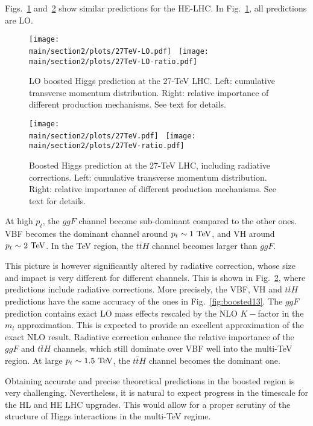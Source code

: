 Figs.~\ref{fig:boosted27-LO} and~\ref{fig:boosted27} show similar predictions for the HE-LHC. In Fig.~\ref{fig:boosted27-LO}, all predictions are LO. 
\begin{figure}[h]
\begin{center}
    \texttt{[image: \\main/section2/plots/27TeV-LO.pdf]}~
    \texttt{[image: \\main/section2/plots/27TeV-LO-ratio.pdf]}
    \caption{
    LO boosted Higgs prediction at the 27-TeV LHC. Left: cumulative transverse momentum distribution.
    Right: relative importance of different production mechanisms. See text for details. 
        \label{fig:boosted27-LO}}
        \end{center}
\end{figure}
\begin{figure}[h]
\begin{center}
    \texttt{[image: \\main/section2/plots/27TeV.pdf]}~
    \texttt{[image: \\main/section2/plots/27TeV-ratio.pdf]}
    \caption{
    Boosted Higgs prediction at the 27-TeV LHC, including radiative corrections. Left: cumulative transverse momentum distribution.
    Right: relative importance of different production mechanisms. See text for details. 
        \label{fig:boosted27}}
        \end{center}
\end{figure}
At high $p_t$, the $ggF$ channel become sub-dominant compared to the other ones. VBF becomes the dominant channel around  $p_t\sim 1~{\rm TeV}$, 
and VH around $p_t\sim 2~{\rm TeV}$. In the TeV region, the $t\bar t H$ channel becomes larger than $ggF$. 

This picture is however significantly altered by radiative correction, whose size and impact is very different for different channels. 
This is shown in Fig.~\ref{fig:boosted27}, where predictions include radiative corrections. More precisely, the VBF, VH and $t\bar t H$ 
predictions have the same accuracy of the ones in Fig.~\ref{fig:boosted13}. The $ggF$ prediction contains exact LO mass effects rescaled
by the NLO $K-$factor in the $m_t$ approximation. This is expected to provide an excellent approximation of the exact NLO result. 
Radiative correction enhance the relative importance of the $ggF$ and $t\bar t H$ channels, which still dominate over VBF well into the
multi-TeV region. At large $p_t \sim 1.5~{\rm TeV}$, the $t\bar t H$ channel becomes the dominant one. 

Obtaining accurate and precise theoretical predictions in the boosted region is very challenging. Nevertheless, it is natural
to expect progress in the timescale for the HL and HE LHC upgrades. This would allow for a proper scrutiny of the structure of
Higgs interactions in the multi-TeV regime. 

